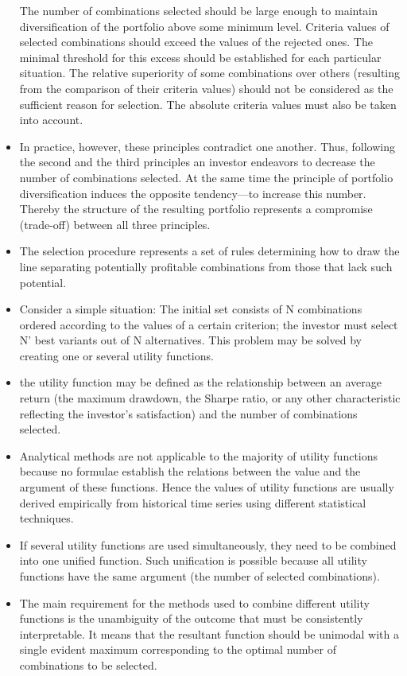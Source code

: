 \begin{itemize}
                \subitem The number of combinations selected should be large enough to maintain diversification of the portfolio above some minimum level.
                \subitem Criteria values of selected combinations should exceed the values of the rejected ones. The minimal threshold for this excess should be established for each particular situation.
                \subitem The relative superiority of some combinations over others (resulting from the comparison of their criteria values) should not be considered as the sufficient reason for selection. The absolute criteria values must also be taken into account.
            \item In practice, however, these principles contradict one another. Thus, following the second and the third principles an investor endeavors to decrease the number of combinations selected. At the same time the principle of portfolio diversification induces the opposite tendency—to increase this number. Thereby the structure of the resulting portfolio represents a compromise (trade-off) between all three principles.
            \item The selection procedure represents a set of rules determining how to draw the line separating potentially profitable combinations from those that lack such potential.
            \item Consider a simple situation: The initial set consists of N combinations ordered according to the values of a certain criterion; the investor must select N’ best variants out of N alternatives. This problem may be solved by creating one or several utility functions.
            \item  the utility function may be defined as the relationship between an average return (the maximum drawdown, the Sharpe ratio, or any other characteristic reflecting the investor’s satisfaction) and the number of combinations selected.
            \item Analytical methods are not applicable to the majority of utility functions because no formulae establish the relations between the value and the argument of these functions. Hence the values of utility functions are usually derived empirically from historical time series using different statistical techniques.
            \item If several utility functions are used simultaneously, they need to be combined into one unified function. Such unification is possible because all utility functions have the same argument (the number of selected combinations).
            \item The main requirement for the methods used to combine different utility functions is the unambiguity of the outcome that must be consistently interpretable. It means that the resultant function should be unimodal with a single evident maximum corresponding to the optimal number of combinations to be selected.

\end{itemize}
